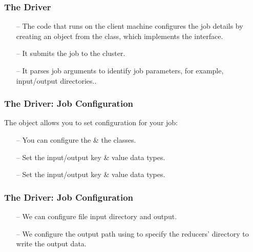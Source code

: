 \begin{frame}[c]{ }
	\frametitle{The Driver }

	\begin{itemize}  [<+->]
		\item [--] The code that runs on the client machine configures the job details by creating an object from the   class, which implements the  interface.
		\item [--] It submits the job to the cluster.		
		\item [--] It parses job arguments to identify job parameters, for example, input/output directories.. 
		
	\end{itemize}

\end{frame}
\begin{frame}[c]{ }
	\frametitle{The Driver:  Job Configuration}
	

The   object allows you to set configuration for your  job:
			\begin{itemize}  [<+->]
				\item [--] You can configure the  \& the  classes.
				\item [--] Set the  input/output key \& value data types.
				\item [--] Set the  input/output key \& value data types.
	
		
			\end{itemize}		

	
\end{frame}
\begin{frame}[c]{ }
	\frametitle{The Driver:  Job Configuration}
	
	\begin{itemize}  [<+->]
		\item [--] We can configure file input directory and output.
		\item [--] We configure the output path using  to specify the reducers' directory to write the output data.
	\end{itemize}		
	
\end{frame}
